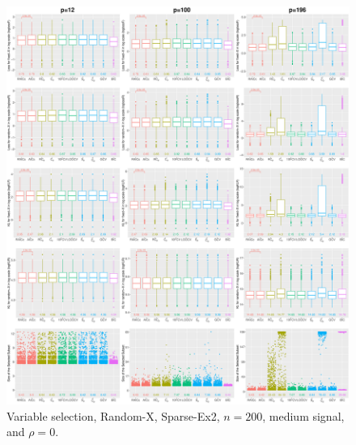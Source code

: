 \begin{figure}[!ht]
\centering
\includegraphics[width=\textwidth]{figures/supplement/randomx/subset_selection/Sparse-Ex2_n200_msnr_rho0.eps}
\caption{Variable selection, Random-X, Sparse-Ex2, $n=200$, medium signal, and $\rho=0$.}
\end{figure}
\clearpage

